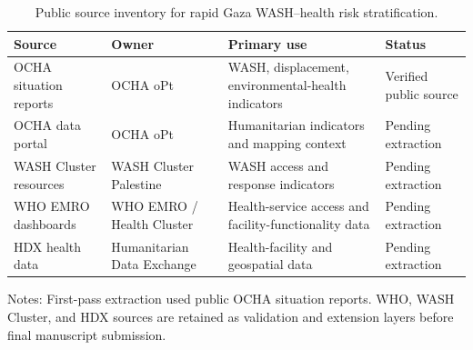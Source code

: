 \begin{table}[htbp]
\centering
\caption{Public source inventory for rapid Gaza WASH--health risk stratification.}
\label{tab:source_inventory}
\begin{tabular}{llll}
\toprule
Source & Owner & Primary use & Status \\
\midrule
OCHA situation reports & OCHA oPt & WASH, displacement, environmental-health indicators & Verified public source \\
OCHA data portal & OCHA oPt & Humanitarian indicators and mapping context & Pending extraction \\
WASH Cluster resources & WASH Cluster Palestine & WASH access and response indicators & Pending extraction \\
WHO EMRO dashboards & WHO EMRO / Health Cluster & Health-service access and facility-functionality data & Pending extraction \\
HDX health data & Humanitarian Data Exchange & Health-facility and geospatial data & Pending extraction \\
\bottomrule
\end{tabular}
\begin{flushleft}
\footnotesize Notes: First-pass extraction used public OCHA situation reports. WHO, WASH Cluster, and HDX sources are retained as validation and extension layers before final manuscript submission.
\end{flushleft}
\end{table}

